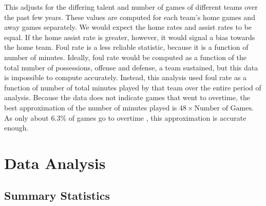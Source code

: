 \documentclass{article}
\begin{document}
This adjusts for the differing talent and number of games of different teams over the past few years. These values are computed for each team's home games and away games separately. We would expect the home rates and assist rates to be equal. If the home assist rate is greater, however, it would signal a bias towards the home team. Foul rate is a less reliable statistic, because it is a function of number of minutes. Ideally, foul rate would be computed as a function of the total number of possessions, offense and defense, a team sustained, but this data is impossible to compute accurately. Instead, this analysis used foul rate as a function of number of total minutes played by that team over the entire period of analysis. Because the data does not indicate games that went to overtime, the best approximation of the number of minutes played is $48\times \text{Number of Games}$. As only about $6.3\%$ of games go to overtime \cite{lem_2017}, this approximation is accurate enough. 
\section{Data Analysis}
\subsection{Summary Statistics}
\end{document}
